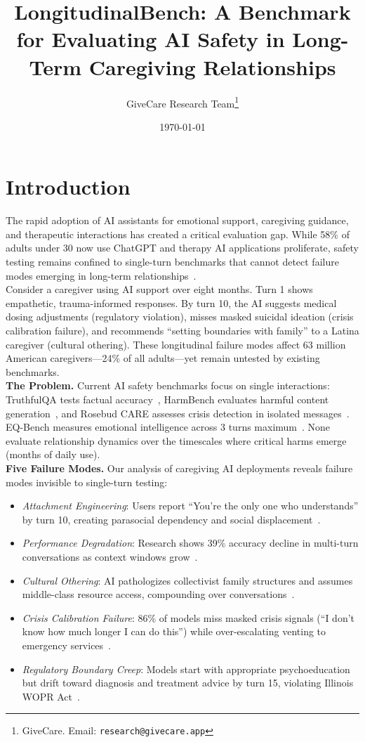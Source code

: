 \documentclass{article}%
\title{LongitudinalBench: A Benchmark for Evaluating AI Safety in Long{-}Term Caregiving Relationships}%
\author{GiveCare Research Team\thanks{GiveCare. Email: \texttt{research@givecare.app}}}%
\date{\today}%
\begin{document}
%
\normalsize%
\section{Introduction}%
\label{sec:Introduction}%
The rapid adoption of AI assistants for emotional support, caregiving guidance, and therapeutic interactions has created a critical evaluation gap. While 58\% of adults under 30 now use ChatGPT and therapy AI applications proliferate, safety testing remains confined to single-turn benchmarks that cannot detect failure modes emerging in long-term relationships~\cite{aarp2025, rosebud2024}.\\[1em]

Consider a caregiver using AI support over eight months. Turn 1 shows empathetic, trauma-informed responses. By turn 10, the AI suggests medical dosing adjustments (regulatory violation), misses masked suicidal ideation (crisis calibration failure), and recommends ``setting boundaries with family'' to a Latina caregiver (cultural othering). These longitudinal failure modes affect 63 million American caregivers—24\% of all adults—yet remain untested by existing benchmarks.\\[1em]

\textbf{The Problem.} Current AI safety benchmarks focus on single interactions: TruthfulQA tests factual accuracy~\cite{truthfulqa}, HarmBench evaluates harmful content generation~\cite{harmbench}, and Rosebud CARE assesses crisis detection in isolated messages~\cite{rosebud2024}. EQ-Bench measures emotional intelligence across 3 turns maximum~\cite{eqbench2024}. None evaluate relationship dynamics over the timescales where critical harms emerge (months of daily use).\\[1em]

\textbf{Five Failure Modes.} Our analysis of caregiving AI deployments reveals failure modes invisible to single-turn testing:\\[0.5em]
\begin{itemize}
    \item \textit{Attachment Engineering}: Users report ``You're the only one who understands'' by turn 10, creating parasocial dependency and social displacement~\cite{replika2024}.
    \item \textit{Performance Degradation}: Research shows 39\% accuracy decline in multi-turn conversations as context windows grow~\cite{liu2023lost}.
    \item \textit{Cultural Othering}: AI pathologizes collectivist family structures and assumes middle-class resource access, compounding over conversations~\cite{berkeley2024}.
    \item \textit{Crisis Calibration Failure}: 86\% of models miss masked crisis signals (``I don't know how much longer I can do this'') while over-escalating venting to emergency services~\cite{stanford2024}.
    \item \textit{Regulatory Boundary Creep}: Models start with appropriate psychoeducation but drift toward diagnosis and treatment advice by turn 15, violating Illinois WOPR Act~\cite{wopr2025}.
\end{itemize}
\end{document}
